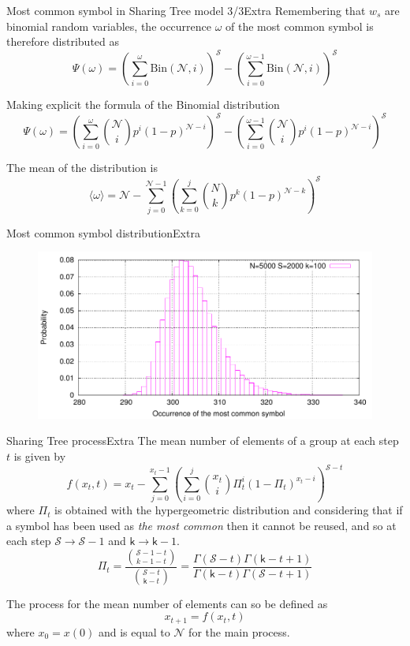 \documentclass[11pt,svgnames]{beamer}
\renewcommand{\kappa}{\mathsf k}
\newcommand{\Esse}{\mathcal S}
\newcommand{\Enne}{\mathcal N}
\begin{document}
\begin{frame}[noframenumbering]{Most common symbol in Sharing Tree model 3/3}{Extra}
Remembering that $w_s$ are binomial random variables, the occurrence $\omega$ of the most common symbol is therefore distributed as 
\[\Psi (\omega) = \left( \sum_{i=0}^{ \omega} \text{Bin}(\Enne, i) \right)^{\Esse}- \left( \sum_{i=0}^{\omega -1} \text{Bin}(\Enne, i) \right)^{\Esse}\]

Making explicit the formula of the Binomial distribution
\[\Psi (\omega) = \left( \sum_{i=0}^{ \omega} \binom{\Enne}{i} p^i (1-p)^{\Enne -i} \right) ^{\Esse}- \left( \sum_{i=0}^{\omega -1} \binom{\Enne}{i} p^i (1-p)^{\Enne -i}\right) ^{\Esse} \]

The mean of the distribution is
\[ \langle \omega \rangle =  \Enne - \sum_{j=0}^{\Enne -1} \left( \sum_{k=0}^{j} \binom{N}{k} p^k (1-p)^{\Enne -k} \right)^\Esse \]
\end{frame}

\begin{frame}[noframenumbering]{Most common symbol distribution}{Extra}
\begin{figure}[p]%
\includegraphics[width=12cm,draft=false]{immagini/campana1.pdf}
\end{figure}
\end{frame}


\begin{frame}[noframenumbering]{Sharing Tree process}{Extra}
The mean number of elements of a group at each step $t$ is given by
\[ f(x_t, t) = x_t - \sum_{j=0}^{x_t-1} \left( \sum_{i=0}^{j} \binom{x_t}{i} \Pi_t^i \left( 1 - \Pi_t \right)^{x_t-i} \right)^{\Esse-t} \]
where $\Pi_t$ is obtained with the hypergeometric distribution and considering that if a symbol has been used as \textit{the most common} then it cannot be reused, and so at each step $\Esse \to \Esse -1$ and $\kappa \to \kappa -1$.
\[ \Pi_t = \frac{\binom{\Esse-1-t}{k-1-t}}{\binom{\Esse-t}{\kappa-t}} = \frac{\Gamma(\Esse-t)\Gamma(\kappa-t+1)}{\Gamma(\kappa-t)\Gamma(\Esse-t+1)}\]

The process for the mean number of elements can so be defined as
\[ x_{t+1} = f(x_{t},t) \]
where $x_0=x(0)$ and is equal to $\Enne$ for the main process.

\end{frame}
\end{document}
